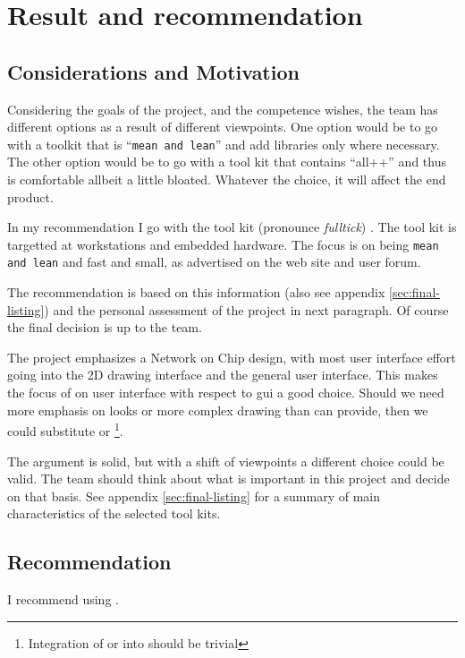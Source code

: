\section{Result and recommendation}
\label{sec:recommendation}

\subsection{Considerations and Motivation}

Considering the goals of the project, and the competence wishes, the team has
different options as a result of different viewpoints.  One option would be to
go with a toolkit that is ``\texttt{mean and lean}'' and add libraries only
where necessary. The other option would be to go with a tool kit that contains
``all++'' and thus is comfortable allbeit a little bloated. Whatever the
choice, it will affect the end product. 

In my recommendation I go with the tool kit  (pronounce
\emph{fulltick}) . The tool kit is targetted at workstations and embedded
hardware. The focus is on being \texttt{mean and lean} and fast and small,
as advertised on the  web site and user forum.

The recommendation is based on this information (also see appendix
\ref{sec:final-listing}) and the personal assessment of the project in next
paragraph. Of course the final decision is up to the team.

The project emphasizes a Network on Chip design, with most user interface
effort going into the 2D drawing interface and the general user interface.
This makes the focus of  on user interface with respect to gui a good
choice. Should we need more emphasis on looks or more complex drawing than
 can provide, then we could substitute  or
\footnote{Integration of  or  into  should
be trivial}.

\par The argument is solid, but with a shift of viewpoints a different choice
could be valid.  The team should think about what is important in this project
and decide on that basis. See appendix \ref{sec:final-listing} for a summary of
main characteristics of the selected tool kits.

\subsection{Recommendation} 

I recommend using .


